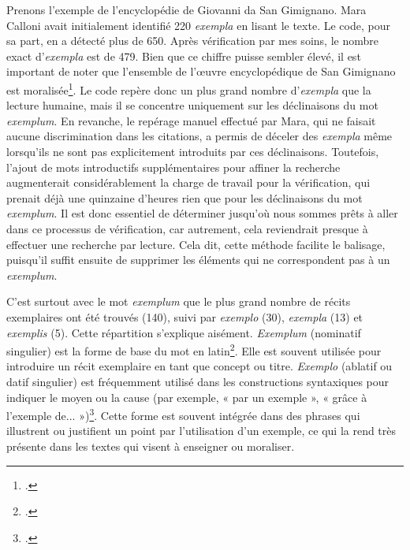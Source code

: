 Prenons l'exemple de l'encyclopédie de Giovanni da San Gimignano. Mara Calloni avait initialement identifié 220 \textit{exempla} en lisant le texte. Le code, pour sa part, en a détecté plus de 650. Après vérification par mes soins, le nombre exact d'\textit{exempla} est de 479. Bien que ce chiffre puisse sembler élevé, il est important de noter que l'ensemble de l'œuvre encyclopédique de San Gimignano est moralisée\footcite{oldoniGiovanniSanGimignano1994}. Le code repère donc un plus grand nombre d'\textit{exempla} que la lecture humaine, mais il se concentre uniquement sur les déclinaisons du mot \textit{exemplum}. En revanche, le repérage manuel effectué par Mara, qui ne faisait aucune discrimination dans les citations, a permis de déceler des \textit{exempla} même lorsqu'ils ne sont pas explicitement introduits par ces déclinaisons. Toutefois, l'ajout de mots introductifs supplémentaires pour affiner la recherche augmenterait considérablement la charge de travail pour la vérification, qui prenait déjà une quinzaine d'heures rien que pour les déclinaisons du mot \textit{exemplum}. Il est donc essentiel de déterminer jusqu'où nous sommes prêts à aller dans ce processus de vérification, car autrement, cela reviendrait presque à effectuer une recherche par lecture. Cela dit, cette méthode facilite le balisage, puisqu'il suffit ensuite de supprimer les éléments qui ne correspondent pas à un \textit{exemplum}.

C'est surtout avec le mot \textit{exemplum} que le plus grand nombre de récits exemplaires ont été trouvés (140), suivi par \textit{exemplo} (30), \textit{exempla} (13) et \textit{exemplis} (5). Cette répartition s'explique aisément. \textit{Exemplum} (nominatif singulier) est la forme de base du mot en latin\footcite{PageDedieeAu2024}. Elle est souvent utilisée pour introduire un récit exemplaire en tant que concept ou titre. \textit{Exemplo} (ablatif ou datif singulier) est fréquemment utilisé dans les constructions syntaxiques pour indiquer le moyen ou la cause (par exemple, « par un exemple », « grâce à l'exemple de... »)\footcite{PageDedieeAu2024}. Cette forme est souvent intégrée dans des phrases qui illustrent ou justifient un point par l'utilisation d'un exemple, ce qui la rend très présente dans les textes qui visent à enseigner ou moraliser.